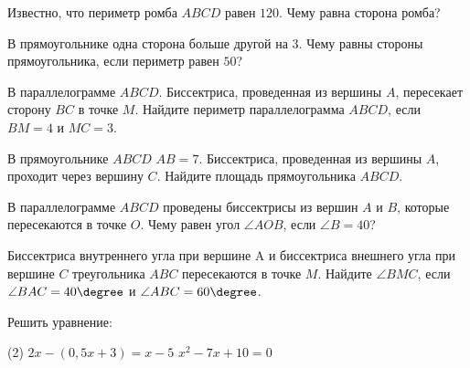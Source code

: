 %
%
\begin{class}[number=1]
	\begin{listofex}
		\item Известно, что периметр ромба \( ABCD \) равен \( 120 \). Чему равна сторона ромба?
		\item В прямоугольнике одна сторона больше другой на \( 3 \). Чему равны стороны прямоугольника, если периметр равен \( 50 \)?
		\item В параллелограмме \( ABCD \). Биссектриса, проведенная из вершины \( A \), пересекает сторону \( BC \) в точке \( M \). Найдите периметр параллелограмма \( ABCD \), если \( BM=4 \) и \( MC=3 \).
		\item В прямоугольнике \( ABCD \) \( AB=7 \). Биссектриса, проведенная из вершины \( A \), проходит через вершину \( C \). Найдите площадь прямоугольника \( ABCD \).
		\item В параллелограмме \( ABCD \) проведены биссектрисы из вершин \( A \) и \( B \), которые пересекаются в точке \( O \). Чему равен угол \( \angle AOB \), если \( \angle B= 40 \)?
		\item Биссектриса внутреннего угла при вершине A и
		биссектриса внешнего угла при вершине \( C \) треугольника \( ABC \)
		пересекаются в точке \( M \). Найдите \( \angle BMC \), если \( \angle BAC = 40\degree \) и \( \angle ABC = 60\degree \).
		\item Решить уравнение:
		\begin{tasks}(2)
			\task \( 2x-(0,5x+3)=x-5 \)
			\task \( x^2-7x+10=0 \)
		\end{tasks}
	\end{listofex}
\end{class}

